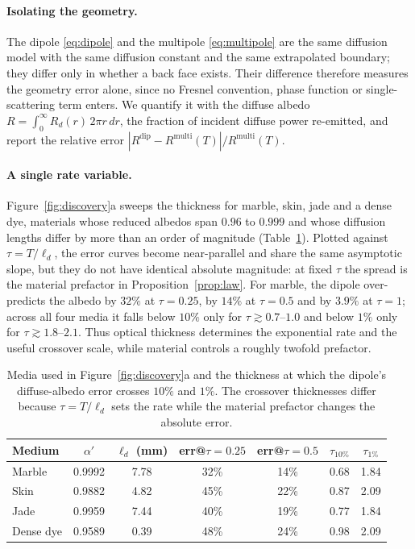 \documentclass[11pt]{article}
\providecommand{\RErrQuarter}{0}
\providecommand{\RErrHalf}{0}
\providecommand{\RErrOne}{0.0}
\providecommand{\RTauTenLo}{0.0}
\providecommand{\RTauTenHi}{0.0}
\providecommand{\RTauOneLo}{0.0}
\providecommand{\RTauOneHi}{0.0}
\renewcommand{\RErrQuarter}{32}
\renewcommand{\RErrHalf}{14}
\renewcommand{\RErrOne}{3.9}
\renewcommand{\RTauTenLo}{0.7}
\renewcommand{\RTauTenHi}{1.0}
\renewcommand{\RTauOneLo}{1.8}
\renewcommand{\RTauOneHi}{2.1}
\newcommand{\ld}{\ell_d}
\begin{document}
\paragraph{Isolating the geometry.}
The dipole \eqref{eq:dipole} and the multipole \eqref{eq:multipole} are the same
diffusion model with the same diffusion constant and the same extrapolated
boundary; they differ only in whether a back face exists. Their difference therefore measures the geometry error alone, since no Fresnel convention, phase function or single-scattering term enters. We quantify
it with the diffuse albedo $R=\int_0^\infty R_d(r)\,2\pi r\,dr$, the fraction of
incident diffuse power re-emitted, and report the relative error
$|R^{\mathrm{dip}}-R^{\mathrm{multi}}(T)|/R^{\mathrm{multi}}(T)$.

\paragraph{A single rate variable.}
Figure~\ref{fig:discovery}a sweeps the thickness for marble, skin, jade and a
dense dye, materials whose reduced albedos span $0.96$ to $0.999$ and whose
diffusion lengths differ by more than an order of magnitude
(Table~\ref{tab:media}). Plotted against $\tau=T/\ld$, the error curves become
near-parallel and share the same asymptotic slope, but they do not have identical
absolute magnitude: at fixed $\tau$ the spread is the material prefactor in
Proposition~\ref{prop:law}. For marble, the dipole over-predicts the albedo by
$\RErrQuarter\%$ at $\tau=0.25$, by $\RErrHalf\%$ at $\tau=0.5$ and by
$\RErrOne\%$ at $\tau=1$; across all four media it falls below $10\%$ only for
$\tau\gtrsim\RTauTenLo$--$\RTauTenHi$ and below $1\%$ only for
$\tau\gtrsim\RTauOneLo$--$\RTauOneHi$. Thus optical thickness determines the
exponential rate and the useful crossover scale, while material controls a
roughly twofold prefactor.

\begin{table}[!tbp]
\centering
\caption{Media used in Figure~\ref{fig:discovery}a and the thickness at which the
dipole's diffuse-albedo error crosses $10\%$ and $1\%$. The crossover thicknesses
differ because $\tau=T/\ld$ sets the rate while the material
prefactor changes the absolute error.}
\label{tab:media}
\small
\begin{tabular}{lcccccc}
\toprule
Medium & $\alpha'$ & $\ell_d$ (mm) & err@$\tau{=}0.25$ & err@$\tau{=}0.5$ & $\tau_{10\%}$ & $\tau_{1\%}$ \\
\midrule
Marble & 0.9992 & 7.78 & 32\% & 14\% & 0.68 & 1.84 \\
Skin & 0.9882 & 4.82 & 45\% & 22\% & 0.87 & 2.09 \\
Jade & 0.9959 & 7.44 & 40\% & 19\% & 0.77 & 1.84 \\
Dense dye & 0.9589 & 0.39 & 48\% & 24\% & 0.98 & 2.09 \\
\bottomrule
\end{tabular}

\end{table}
\end{document}
